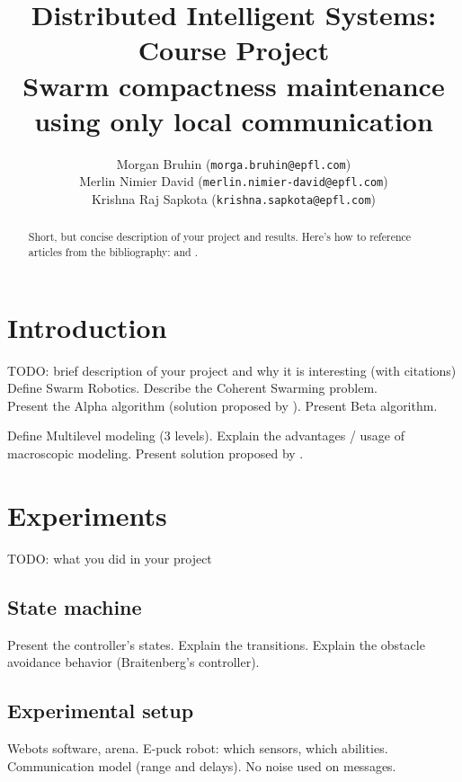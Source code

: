 \documentclass[a4paper, 10pt, conference]{ieeeconf}
\title{ %
  Distributed Intelligent Systems: Course Project\\
  Swarm compactness maintenance using only local communication
}
\author{
  Morgan Bruhin (\texttt{morga.bruhin@epfl.com}) \\
  Merlin Nimier David (\texttt{merlin.nimier-david@epfl.com}) \\
  Krishna Raj Sapkota (\texttt{krishna.sapkota@epfl.com})
}
\begin{document}
\maketitle
\thispagestyle{empty}
\pagestyle{empty}

\begin{abstract}
  Short, but concise description of your project and results.
  Here's how to reference articles from the bibliography: \cite{Nembrini02} and \cite{Winfield08}.
\end{abstract}

\section{Introduction}
  TODO: brief description of your project and why it is interesting (with citations)\\

  Define Swarm Robotics. Describe the Coherent Swarming problem.\\

  Present the Alpha algorithm (solution proposed by \cite{Nembrini02}). Present Beta algorithm.

  Define Multilevel modeling (3 levels). Explain the advantages / usage of macroscopic modeling. Present solution proposed by \cite{Winfield08}.


\section{Experiments}
  TODO: what you did in your project\\

  \subsection{State machine}
  Present the controller's states. Explain the transitions. Explain the obstacle avoidance behavior (Braitenberg's controller).

  \subsection{Experimental setup}
  Webots software, arena. E-puck robot: which sensors, which abilities. Communication model (range and delays). No noise used on messages.\\
\end{document}

